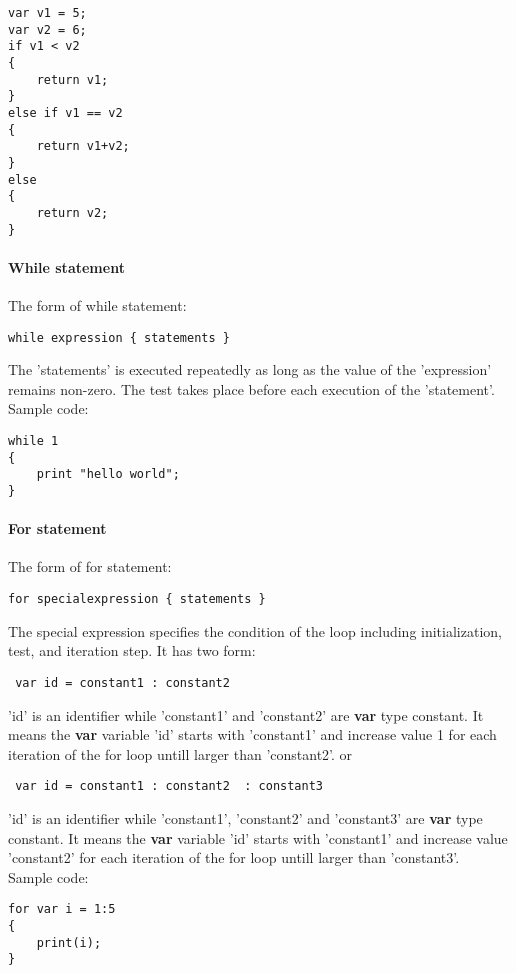 \documentclass[12pt]{article} %
\begin{document}
\begin{lstlisting}
var v1 = 5;
var v2 = 6;
if v1 < v2
{
	return v1;
}	
else if v1 == v2
{
	return v1+v2;
}
else
{
	return v2;
}
\end{lstlisting}


\paragraph{While statement}
The form of while statement:
\begin{lstlisting}
while expression { statements }
\end{lstlisting}
\noindent The  'statements' is executed repeatedly as long as the value of the 'expression' remains non-zero. The test takes place before each execution of the 'statement'. Sample code:

\begin{lstlisting}
while 1
{
	print "hello world";
}
\end{lstlisting}

\paragraph{For statement}
The form of for statement:
\begin{lstlisting}
for specialexpression { statements }
\end{lstlisting}
\noindent The special expression specifies the condition of the loop including initialization, test, and iteration step. It has two form:
\begin{lstlisting}
 var id = constant1 : constant2
\end{lstlisting}
'id' is an identifier while  'constant1' and 'constant2' are \textbf{var} type constant.  It means the \textbf{var} variable 'id' starts with 'constant1'  and increase value 1 for each iteration of the for loop  untill larger than 'constant2'.
or 
\begin{lstlisting}
 var id = constant1 : constant2  : constant3
\end{lstlisting}
'id' is an identifier while  'constant1', 'constant2' and 'constant3' are \textbf{var} type constant.  It means the \textbf{var} variable 'id' starts with 'constant1'  and increase value 'constant2' for each iteration of the for loop  untill larger than 'constant3'.\\
Sample code:
\begin{lstlisting}
for var i = 1:5
{
	print(i);
}
\end{lstlisting}
\end{document}

